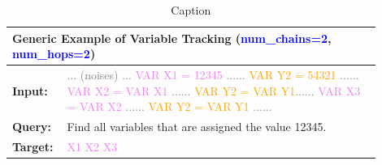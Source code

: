 \begin{table}[!h]
    \centering
    \begin{tabular}{p{0.1\linewidth}p{0.8\linewidth}}
    \toprule
        \multicolumn{2}{l}{\textbf{Generic Example of Variable Tracking (\textcolor{blue}{num\_chains=2}, \textcolor{blue}{num\_hops=2})}} \\ \midrule
        \textbf{Input:} & \textcolor{gray}{... (noises) ...} \textcolor{violet}{VAR X1 = 12345} \textcolor{gray}{......}  \textcolor{orange}{VAR Y2 = 54321} \textcolor{gray}{......} \textcolor{violet}{VAR X2 = VAR X1} \textcolor{gray}{......} \textcolor{orange}{VAR Y2 = VAR Y1}\textcolor{gray}{......} 
 \textcolor{violet}{VAR X3 = VAR X2}   
 \textcolor{gray}{......} 
 \textcolor{orange}{VAR Y2 = VAR Y1} \textcolor{gray}{......} \\
 \textbf{Query:} & Find all variables that are assigned the value 12345. \\
 \textbf{Target:} & \textcolor{violet}{X1 X2 X3}
 \\ 
         \bottomrule
    \end{tabular}
    \caption{Caption}
    \label{tab:eg_vartrack}
\end{table}
